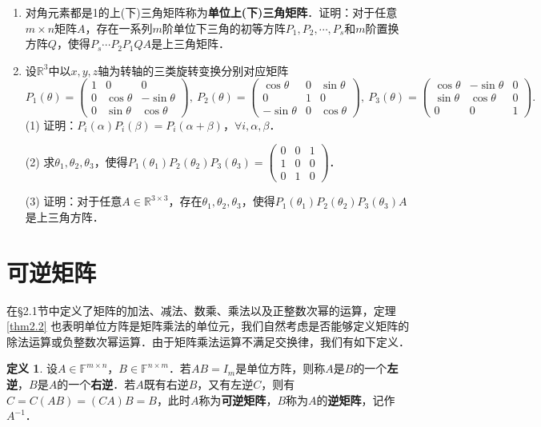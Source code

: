 \documentclass[a4paper,fontset=windows]{ctexbook}
\theoremstyle{definition}
\newtheorem{definition}{定义}[chapter]
\begin{document}
\begin{enumerate}
\item 对角元素都是1的上(下)三角矩阵称为{\bf 单位上(下)三角矩阵}．证明：对于任意$m\times n$矩阵$A$，存在一系列$m$阶单位下三角的初等方阵$P_1,P_2,\cdots,P_s$和$m$阶置换方阵$Q$，使得$P_s\cdots P_2P_1QA$是上三角矩阵．

\item 设$\mathbb{R}^3$中以$x,y,z$轴为转轴的三类旋转变换分别对应矩阵
$$P_1(\theta)=\begin{pmatrix}1&0&0 \\ 0&\cos\theta&-\sin\theta \\ 0&\sin\theta&\cos\theta\end{pmatrix},~P_2(\theta)=\begin{pmatrix}\cos\theta&0&\sin\theta \\ 0&1&0 \\ -\sin\theta&0&\cos\theta\end{pmatrix},~P_3(\theta)=\begin{pmatrix}\cos\theta&-\sin\theta&0 \\ \sin\theta&\cos\theta&0 \\ 0&0&1\end{pmatrix}.$$
(1) 证明：$P_i(\alpha)P_i(\beta)=P_i(\alpha+\beta)$，$\forall i,\alpha,\beta$．

(2) 求$\theta_1,\theta_2,\theta_3$，使得$P_1(\theta_1)P_2(\theta_2)P_3(\theta_3)=\begin{pmatrix}0&0&1 \\ 1&0&0 \\ 0&1&0\end{pmatrix}$．

(3) 证明：对于任意$A\in\mathbb{R}^{3\times 3}$，存在$\theta_1,\theta_2,\theta_3$，使得$P_1(\theta_1)P_2(\theta_2)P_3(\theta_3)A$是上三角方阵．

\end{enumerate}

\clearpage\section{可逆矩阵}

在\S 2.1节中定义了矩阵的加法、减法、数乘、乘法以及正整数次幂的运算，定理\ref{thm2.2} 也表明单位方阵是矩阵乘法的单位元，我们自然考虑是否能够定义矩阵的除法运算或负整数次幂运算．由于矩阵乘法运算不满足交换律，我们有如下定义．

\begin{definition}
设$A\in\mathbb{F}^{m\times n}$，$B\in\mathbb{F}^{n\times m}$．若$AB=I_m$是单位方阵，则称$A$是$B$的一个{\bf 左逆}，$B$是$A$的一个{\bf 右逆}．若$A$既有右逆$B$，又有左逆$C$，则有$C=C(AB)=(CA)B=B$，此时$A$称为{\bf 可逆矩阵}，$B$称为$A$的{\bf 逆矩阵}，记作$A^{-1}$．
\end{definition}
\end{document}

